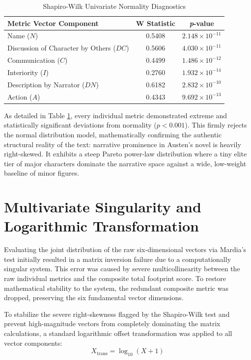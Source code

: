 \begin{table}[H]
\centering
\caption{Shapiro-Wilk Univariate Normality Diagnostics}
\label{tab:shapiro}
\vspace{2mm}
\begin{tabular}{lcc}
\toprule
\textbf{Metric Vector Component} & \textbf{W Statistic} & \textbf{\textit{p}-value} \\
\midrule
Name ($N$)   & 0.5408 & $2.148 \times 10^{-11}$ \\
Discussion of Character by Others ($DC$)      & 0.5606 & $4.030 \times 10^{-11}$ \\
Communication ($C$)              & 0.4499 & $1.486 \times 10^{-12}$ \\
Interiority ($I$)           & 0.2760 & $1.932 \times 10^{-14}$ \\
Description by Narrator ($DN$)               & 0.6182 & $2.832 \times 10^{-10}$ \\
Action ($A$)               & 0.4343 & $9.692 \times 10^{-13}$ \\
\bottomrule
\end{tabular}
\end{table}

As detailed in Table \ref{tab:shapiro}, every individual metric demonstrated extreme and statistically significant deviations from normality ($p < 0.001$). This firmly rejects the normal distribution model, mathematically confirming the authentic structural reality of the text: narrative prominence in Austen's novel is heavily right-skewed. It exhibits a steep Pareto power-law distribution where a tiny elite tier of major characters dominate the narrative space against a wide, low-weight baseline of minor figures.

\section{Multivariate Singularity and Logarithmic Transformation}
Evaluating the joint distribution of the raw six-dimensional vectors via Mardia's test initially resulted in a matrix inversion failure due to a computationally singular system. This error was caused by severe multicollinearity between the raw individual metrics and the composite total footprint score. To restore mathematical stability to the system, the redundant composite metric was dropped, preserving the six fundamental vector dimensions. 

To stabilize the severe right-skewness flagged by the Shapiro-Wilk test and prevent high-magnitude vectors from completely dominating the matrix calculations, a standard logarithmic offset transformation was applied to all vector components:
\begin{equation}
    X_{\text{trans}} = \log_{10}(X + 1)
\end{equation}

